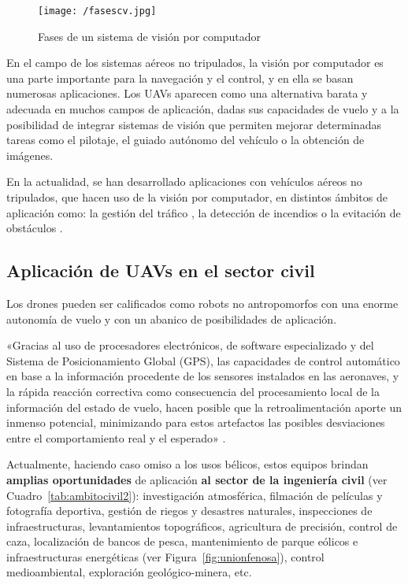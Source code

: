 \begin{figure}[!h]
\begin{center}
\texttt{[image: /fasescv.jpg]}
\caption[Fases de un sistema de visión por computador]{Fases de un sistema de visión por computador \cite{visionporcomputador}}
\label{fig:fasescv}
\end{center}
\end{figure}

En el campo de los sistemas aéreos no tripulados, la visión por computador es una parte importante para la navegación y el control, 
y en ella se basan numerosas aplicaciones. Los \acs{UAV}s aparecen como una alternativa barata y adecuada en muchos campos
de aplicación, dadas sus capacidades de vuelo y a la posibilidad de integrar sistemas de visión que permiten mejorar determinadas 
tareas como el pilotaje, el guiado autónomo del vehículo o la obtención de imágenes.

En la actualidad, se han desarrollado aplicaciones con vehículos aéreos no tripulados, que hacen uso de la visión por computador, en distintos ámbitos de aplicación como: la gestión del tráfico \cite{controltrafico}, la detección de incendios \cite{incendios} o la evitación de obstáculos \cite{obstaculos}.

\subsection{Aplicación de \acs{UAV}s en el sector civil}
\label{sec:ingenieriacivil}

Los drones pueden ser calificados como robots no antropomorfos con una enorme autonomía de vuelo y con un abanico de posibilidades de aplicación.

«Gracias al uso de procesadores electrónicos, de software especializado y del Sistema de Posicionamiento Global (\acs{GPS}), las capacidades de control automático en base a la información procedente de los sensores instalados en las aeronaves, y la rápida reacción correctiva como consecuencia del procesamiento local de la información del estado de vuelo, hacen posible que la retroalimentación aporte un inmenso potencial,
minimizando para estos artefactos las posibles desviaciones entre el comportamiento real y el esperado» \cite{ambitocivil}.

Actualmente, haciendo caso omiso a los usos bélicos, estos equipos brindan \textbf{amplias oportunidades} de aplicación \textbf{al sector de la ingeniería civil} (ver Cuadro~\ref{tab:ambitocivil2}): investigación atmosférica, filmación de películas y fotografía deportiva, gestión de riegos y desastres naturales, inspecciones de infraestructuras, levantamientos topográficos, agricultura de precisión, control de caza, localización de bancos de pesca, mantenimiento de parque eólicos e infraestructuras energéticas (ver Figura~\ref{fig:unionfenosa}), control medioambiental, exploración geológico-minera, etc.

